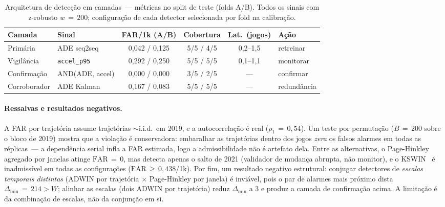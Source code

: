 \documentclass[runningheads]{llncs}
\begin{document}
\begin{table}[t]
\centering
\caption{Arquitetura de detec\c{c}\~ao em camadas~--- m\'etricas no split de
teste (folds A/B). Todos os sinais com z-robusto $w\,{=}\,200$; configura\c{c}\~ao
de cada detector selecionada por fold na calibra\c{c}\~ao.}
\label{tab:deteccao}
\footnotesize
\begin{tabular}{llcccl}
\toprule
Camada & Sinal & FAR/1k (A/B) & Cobertura & Lat.\ (jogos) & A\c{c}\~ao \\
\midrule
Prim\'aria        & ADE seq2seq         & 0{,}042 / 0{,}125 & 5/5 / 4/5 & 0{,}2--1{,}5 & retreinar \\
Vigil\^ancia      & \texttt{accel\_p95} & 0{,}292 / 0{,}250 & 5/5 / 5/5 & 0{,}1--1{,}1 & monitorar \\
Confirma\c{c}\~ao & AND(ADE, accel)     & 0{,}000 / 0{,}000 & 3/5 / 2/5 & ---          & confirmar \\
\midrule
Corroborador      & ADE Kalman          & 0{,}167 / 0{,}083 & 5/5 / 5/5 & ---          & redund\^ancia \\
\bottomrule
\end{tabular}
\end{table}

\paragraph{Ressalvas e resultados negativos.}
A FAR por trajet\'oria assume trajet\'orias ${\sim}$i.i.d.\ em 2019, e a autocorrela\c{c}\~ao \'e real ($\rho_1\,{=}\,0{,}54$). Um teste por permuta\c{c}\~ao ($B\,{=}\,200$ sobre o bloco de 2019) mostra que a viola\c{c}\~ao \'e conservadora: embaralhar as trajet\'orias dentro dos jogos \emph{zera} os falsos alarmes em todas as r\'eplicas~--- a depend\^encia serial infla a FAR estimada, logo a admissibilidade n\~ao \'e artefato dela. Entre as alternativas, o Page-Hinkley~\cite{page_hinkley} agregado por janelas atinge $\mathrm{FAR}\,{=}\,0$, mas detecta apenas o salto de 2021 (validador de mudan\c{c}a abrupta, n\~ao monitor), e o KSWIN~\cite{kswin} \'e inadmiss\'ivel em todas as configura\c{c}\~oes ($\mathrm{FAR}\,{\geq}\,0{,}438$/1k). Por fim, um resultado negativo estrutural: conjugar detectores de \emph{escalas temporais distintas} (ADWIN por trajet\'oria $\times$ Page-Hinkley por janela) \'e invi\'avel, pois o par de alarmes mais pr\'oximo dista $\Delta_{\min}\,{=}\,214 > W$; alinhar as escalas (dois ADWIN por trajet\'oria) reduz $\Delta_{\min}$ a 3 e produz a camada de confirma\c{c}\~ao acima. A limita\c{c}\~ao \'e da combina\c{c}\~ao de escalas, n\~ao da conjun\c{c}\~ao em si.
\end{document}
